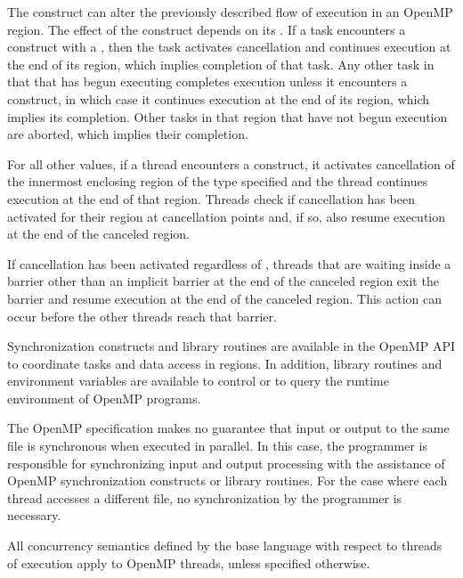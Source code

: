 The  construct can alter the previously described flow of execution 
in an OpenMP region. The effect of the  construct depends on its
. If a task encounters a  construct with 
a  , then the task activates cancellation 
and continues execution at the end of its  region, which implies 
completion of that task. Any other task in that  that has begun 
executing completes execution unless it encounters a 
 construct, in which case it continues execution at the end of its 
 region, which implies its completion. Other tasks in that 
 region that have not begun execution are aborted, which 
implies their completion.

For all other  values, if a thread encounters a 
 construct, it activates cancellation of the innermost enclosing 
region of the type specified and the thread continues execution at the end of 
that region. Threads check if cancellation has been activated for their region 
at cancellation points and, if so, also resume execution at
the end of the canceled region.

If cancellation has been activated regardless of ,
threads that are waiting inside a barrier other than an implicit barrier at 
the end of the canceled region exit the barrier and resume execution at the 
end of the canceled region. This action can occur before the other threads 
reach that barrier.

Synchronization constructs and library routines are available in the OpenMP 
API to coordinate tasks and data access in  regions. In addition, 
library routines and environment variables are available to control or to query 
the runtime environment of OpenMP programs.

The OpenMP specification makes no guarantee that input or output to the same file is
synchronous when executed in parallel. In this case, the programmer is responsible for
synchronizing input and output processing with the assistance of OpenMP
synchronization constructs or library routines. For the case where each thread 
accesses a different file, no synchronization by the programmer is necessary.

All concurrency semantics defined by the base language with respect to threads
of execution apply to OpenMP threads, unless specified otherwise.

